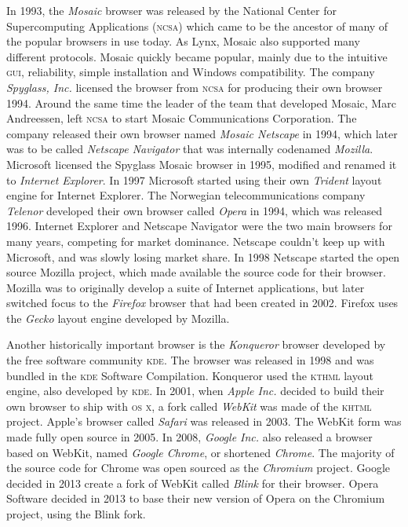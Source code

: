 \documentclass[a4paper,11pt]{kth-mag}
\begin{document}
        In 1993, the \emph{Mosaic} browser was released by the National Center for Supercomputing Applications (\textsc{ncsa}) which came to be the ancestor of many of the popular browsers in use today.
        As Lynx, Mosaic also supported many different protocols.
        Mosaic quickly became popular, mainly due to the intuitive \textsc{gui}, reliability, simple installation and Windows compatibility.
        The company \emph{Spyglass, Inc.} licensed the browser from \textsc{ncsa} for producing their own browser 1994.
        Around the same time the leader of the team that developed Mosaic, Marc Andreessen, left \textsc{ncsa} to start Mosaic Communications Corporation.
        The company released their own browser named \emph{Mosaic Netscape} in 1994, which later was to be called \emph{Netscape Navigator} that was internally codenamed \emph{Mozilla}.
        Microsoft licensed the Spyglass Mosaic browser in 1995, modified and renamed it to \emph{Internet Explorer}.
        In 1997 Microsoft started using their own \emph{Trident} layout engine for Internet Explorer.
        The Norwegian telecommunications company \emph{Telenor} developed their own browser called \emph{Opera} in 1994, which was released 1996.
        Internet Explorer and Netscape Navigator were the two main browsers for many years, competing for market dominance.
        Netscape couldn't keep up with Microsoft, and was slowly losing market share.
        In 1998 Netscape started the open source Mozilla project, which made available the source code for their browser.
        Mozilla was to originally develop a suite of Internet applications, but later switched focus to the \emph{Firefox} browser that had been created in 2002.
        Firefox uses the \emph{Gecko} layout engine developed by Mozilla.

        Another historically important browser is the \emph{Konqueror} browser developed by the free software community \textsc{kde}.
        The browser was released in 1998 and was bundled in the \textsc{kde} Software Compilation.
        Konqueror used the \textsc{kthml} layout engine, also developed by \textsc{kde}.
        In 2001, when \emph{Apple Inc.} decided to build their own browser to ship with \textsc{os x}, a fork called \emph{WebKit} was made of the \textsc{khtml} project.
        Apple's browser called \emph{Safari} was released in 2003.
        The WebKit form was made fully open source in 2005.
        In 2008, \emph{Google Inc.} also released a browser based on WebKit, named \emph{Google Chrome}, or shortened \emph{Chrome}.
        The majority of the source code for Chrome was open sourced as the \emph{Chromium} project.
        Google decided in 2013 create a fork of WebKit called \emph{Blink} for their browser.
        Opera Software decided in 2013 to base their new version of Opera on the Chromium project, using the Blink fork.
\end{document}
